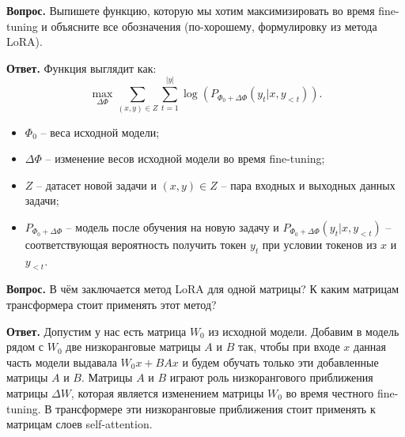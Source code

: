 \documentclass[12pt, a4paper]{article}
\begin{document}
\par \bigskip \textbf{Вопрос. } Выпишете функцию, которую мы хотим максимизировать во время fine-tuning и объясните все обозначения (по-хорошему, формулировку из метода LoRA).

\par \bigskip \textbf{Ответ. } Функция выглядит как: \[ \max_{\Delta \Phi} \sum_{(x, y) \in Z} \sum_{t = 1}^{|y|} \log \left( P_{\Phi_0 + \Delta \Phi} (y_t | x, y_{< t}) \right) . \]

\begin{itemize}
    \item $\Phi_0$ -- веса исходной модели;
    \item $\Delta \Phi$ -- изменение весов исходной модели во время fine-tuning;
    \item $Z$ -- датасет новой задачи и $(x, y) \in Z$ -- пара входных и выходных данных задачи;
    \item $P_{\Phi_0 + \Delta \Phi}$ -- модель после обучения на новую задачу и $P_{\Phi_0 + \Delta \Phi} (y_t | x, y_{< t})$ -- соответствующая вероятность получить токен $y_t$ при условии токенов из $x$ и $y_{< t}$.
\end{itemize}

\par \bigskip \textbf{Вопрос. } В чём заключается метод LoRA для одной матрицы? К каким матрицам трансформера стоит применять этот метод?

\par \bigskip \textbf{Ответ. } Допустим у нас есть матрица $W_0$ из исходной модели. Добавим в модель рядом с $W_0$ две низкоранговые матрицы $A$ и $B$ так, чтобы при входе $x$ данная часть модели выдавала $W_0 x + B A x$ и будем обучать только эти добавленные матрицы $A$ и $B$. Матрицы $A$ и $B$ играют роль низкорангового приближения матрицы $\Delta W$, которая является изменением матрицы $W_0$ во время честного fine-tuning. В трансформере эти низкоранговые приближения стоит применять к матрицам слоев self-attention.
\end{document}
